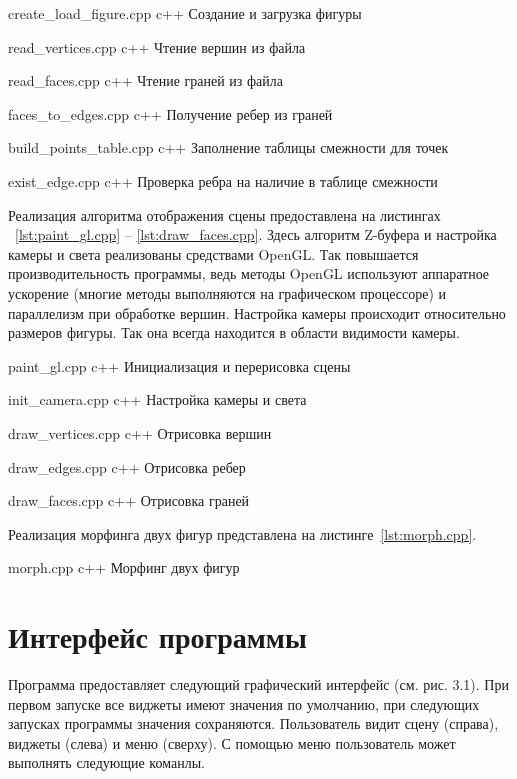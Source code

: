 {create_load_figure.cpp}
{c++}
{Создание и загрузка фигуры}

{read_vertices.cpp}
{c++}
{Чтение вершин из файла}

{read_faces.cpp}
{c++}
{Чтение граней из файла}

{faces_to_edges.cpp}
{c++}
{Получение ребер из граней}

{build_points_table.cpp}
{c++}
{Заполнение таблицы смежности для точек}

{exist_edge.cpp}
{c++}
{Проверка ребра на наличие в таблице смежности}


Реализация алгоритма отображения сцены предоставлена на листингах ~\ref{lst:paint_gl.cpp} -- \ref{lst:draw_faces.cpp}. 
Здесь алгоритм Z-буфера и настройка камеры и света реализованы средствами OpenGL.
Так повышается производительность программы, ведь методы OpenGL используют аппаратное ускорение (многие методы выполняются на графическом процессоре) и параллелизм при обработке вершин. 
Настройка камеры происходит относительно размеров фигуры. 
Так она всегда находится в области видимости камеры.

{paint_gl.cpp}
{c++}
{Инициализация и перерисовка сцены}

{init_camera.cpp}
{c++}
{Настройка камеры и света}

{draw_vertices.cpp}
{c++}
{Отрисовка вершин}

{draw_edges.cpp}
{c++}
{Отрисовка ребер}

{draw_faces.cpp}
{c++}
{Отрисовка граней}

\newpage

Реализация морфинга двух фигур представлена на листинге~\ref{lst:morph.cpp}.

{morph.cpp}
{c++}
{Морфинг двух фигур}


\section{Интерфейс программы}

Программа предоставляет следующий графический интерфейс (см. рис. 3.1). 
При первом запуске все виджеты имеют значения по умолчанию, при следующих запусках программы значения сохраняются.
Пользователь видит сцену (справа), виджеты (слева) и меню (сверху).
С помощью меню пользователь может выполнять следующие команлы.

